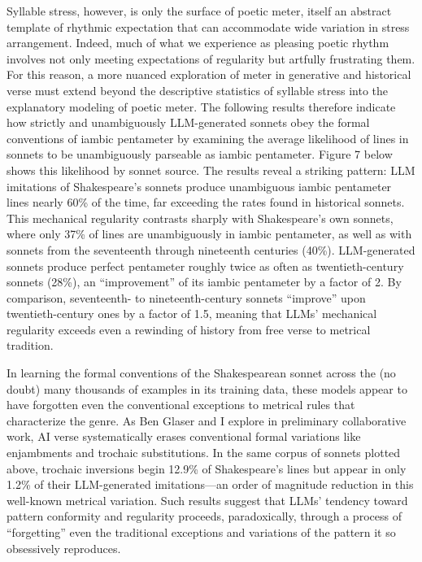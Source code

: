 \documentclass{simple-humanities}         %
\begin{document}
Syllable stress, however, is only the surface of poetic meter, itself an abstract template of rhythmic expectation that can accommodate wide variation in stress arrangement.
Indeed, much of what we experience as pleasing poetic rhythm involves not only meeting expectations of regularity but artfully frustrating them. 
For this reason, a more nuanced exploration of meter in generative and historical verse must extend beyond the descriptive statistics of syllable stress into the explanatory modeling of poetic meter.
The following results therefore indicate how strictly and unambiguously LLM-generated sonnets obey the formal conventions of iambic pentameter by examining the average likelihood of lines in sonnets to be unambiguously parseable as iambic pentameter. Figure 7 below shows this likelihood by sonnet source.
The results reveal a striking pattern: LLM imitations of Shakespeare's sonnets produce unambiguous iambic pentameter lines nearly 60\% of the time, far exceeding the rates found in historical sonnets. This mechanical regularity contrasts sharply with Shakespeare's own sonnets, where only 37\% of lines are unambiguously in iambic pentameter, as well as with sonnets from the seventeenth through nineteenth centuries (40\%). LLM-generated sonnets produce perfect pentameter roughly twice as often as twentieth-century sonnets (28\%), an ``improvement'' of its iambic pentameter by a factor of 2. By comparison, seventeenth- to nineteenth-century sonnets ``improve'' upon twentieth-century ones by a factor of 1.5, meaning that LLMs' mechanical regularity exceeds even a rewinding of history from free verse to metrical tradition.

In learning the formal conventions of the Shakespearean sonnet across the (no doubt) many thousands of examples in its training data, these models appear to have forgotten even the conventional exceptions to metrical rules that characterize the genre. As Ben Glaser and I explore in preliminary collaborative work, AI verse systematically erases conventional formal variations like enjambments and trochaic substitutions. In the same corpus of sonnets plotted above, trochaic inversions begin 12.9\% of Shakespeare's lines but appear in only 1.2\% of their LLM-generated imitations---an order of magnitude reduction in this well-known metrical variation. Such results suggest that LLMs' tendency toward pattern conformity and regularity proceeds, paradoxically, through a process of ``forgetting'' even the traditional exceptions and variations of the pattern it so obsessively reproduces.
\end{document}
